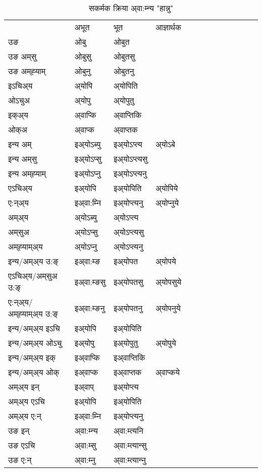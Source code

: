\begin{table}[H]
\centering
\caption{\label{op.vt} सकर्मक क्रिया  अ्वा:म्‍न्य  "हान्नु"  }
\begin{tabular}{l|l|l|l|l|l|l|l|l|l|l|l|l}  \toprule
&अभूत & भूत & आज्ञार्थक \\ 
उङ &ओबु &ओबुत \\ 
उङ अम्‌सु &ओबुसु &ओबुतसु \\ 
उङ अम्‌ह्‍याम् &ओबुनु &ओबुतनु \\ 
इऽचिअ्य &अ्योपि &अ्योपिति   \\ 
ओऽचुअ &अ्योपु &अ्योपुतु   \\ 
इक्अ्य &अ्वाप्कि &अ्वाप्‍तिकि   \\ 
ओक्अ &अ्वाप्क &अ्वाप्‍तक   \\ 
इन्य अम् & इअ्योऽब्यु  & इअ्योऽप्‍त्य &अ्योऽबे  \\ 
इन्य अम्‌सु & इअ्योऽप्सु  & इअ्योऽप्‍त्यसु   \\ 
इन्य अम्‌ह्‍याम् & इअ्योऽप्‍नु  & इअ्योऽप्‍त्यनु   \\ 
एऽचिअ्य & इअ्योपि & इअ्योपिति &अ्योपिये    \\ 
ए:न्अ्य & इअ्वा:म्‍नि  & इअ्योप्‍त्यनु &अ्योप्‍नुये  \\ 
अम्अ्य & अ्योऽब्यु  & अ्योऽप्‍त्य  \\ 
अम्‌सुअ & अ्योऽप्सु & अ्योऽप्‍त्यसु  \\ 
अम्‌ह्‍याम्अ्य & अ्योऽप्‍नु  & अ्योऽप्‍त्यनु \\ 
\midrule
इन्य/अम्अ्य उ:ङ्‌&इअ्वा:म्ङ & इअ्योपत &अ्योपये \\ 
एऽचिअ्य/अम्‌सुअ उ:ङ्‌ &इअ्वा:म्ङसु & इअ्योपतसु &अ्योपसुये \\ 
ए:न्अ्य/अम्‌ह्‍याम्अ्य उ:ङ्‌ &इअ्वा:म्ङनु & इअ्योपतनु &अ्योपनुये \\ 
इन्य/अम्अ्य इऽचि & इअ्योपि & इअ्योपिति    \\ 
इन्य/अम्अ्य ओऽचु & इअ्योपु & इअ्योपुतु  &अ्योपुये  \\ 
इन्य/अम्अ्य इक् & इअ्वाप्कि & इअ्वाप्‍तिकि   \\ 
इन्य/अम्अ्य ओक् & इअ्वाप्क & इअ्वाप्‍तक  &अ्वाप्कये  \\ 
अम्अ्य इन् & इअ्वाप् & इअ्योप्‍त्य   \\ 
अम्अ्य एऽचि & इअ्योपि & इअ्योपिति    \\ 
अम्अ्य ए:न् & इअ्वा:म्‍नि  & इअ्योप्‍त्यनु  \\ 
\midrule
उङ इन् & अ्वा:म्‍न्य  & अ्वा:म्त्यनि  \\ 
उङ एऽचि & अ्वा:म्सु  & अ्वा:म्त्यान्सु   \\ 
उङ ए:न्& अ्वा:म्‍नु  & अ्वा:म्त्यान्‍नु   \\ 
\bottomrule
\end{tabular}
\end{table}


